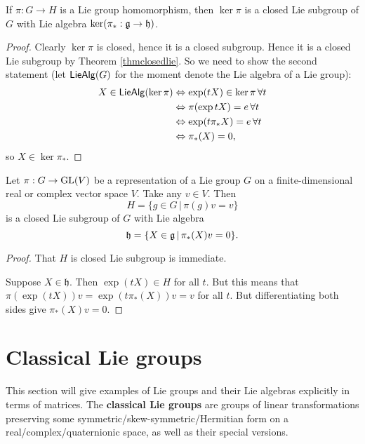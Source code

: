 \documentclass[11pt, english]{article}
\begin{document}
\begin{prop}
  If $\pi:G \to H$ is a Lie group homomorphism, then $\ker \pi$ is a closed Lie subgroup of $G$ with Lie algebra $\ker( \pi_\ast: \mathfrak g \to \mathfrak h)$.
\end{prop}

\begin{proof}
 Clearly $ \ker \pi$ is closed, hence it is a closed subgroup. Hence it is a closed Lie subgroup by Theorem \ref{thmclosedlie}. So we need to show the second statement (let $\mathsf{LieAlg}(G)$ for the moment denote the Lie algebra of a Lie group):
 \begin{align*}
 X \in \mathsf{LieAlg}(\ker \pi) &\Leftrightarrow \exp(tX) \in \ker \pi \, \forall t \\
&\Leftrightarrow \pi(\exp tX) = e \, \forall t \\
&\Leftrightarrow \exp(t \pi_\ast X) = e \, \forall t \\
&\Leftrightarrow \pi_\ast(X) = 0,
 \end{align*}
so $X \in \ker \pi_\ast$.
\end{proof}

\begin{prop}
  Let $\pi:G \to \operatorname{GL}(V)$ be a representation of a Lie group $G$ on a finite-dimensional real or complex vector space $V$. Take any $v \in V$. Then
$$
H = \{ g \in G \, | \, \pi(g) v = v \}
$$
is a closed Lie subgroup of $G$ with Lie algebra
$$
\mathfrak h = \{ X \in \mathfrak g \, | \, \pi_\ast(X) v = 0 \}.
$$
\end{prop}

\begin{proof}
 That $H$ is closed Lie subgroup is immediate.

Suppose $X \in \mathfrak h$. Then $\exp(t X) \in H$ for all $t$. But this means that $\pi(\exp(tX))v=\exp(t\pi_\ast( X))v = v$ for all $t$. But differentiating both sides give $\pi_\ast(X)v = 0$. 
\end{proof}


\newpage
\section{Classical Lie groups}

This section will give examples of Lie groups and their Lie algebras explicitly in terms of matrices. The \textbf{classical Lie groups} are groups of linear transformations preserving some symmetric/skew-symmetric/Hermitian form on a real/complex/quaternionic space, as well as their special versions. 
\end{document}
